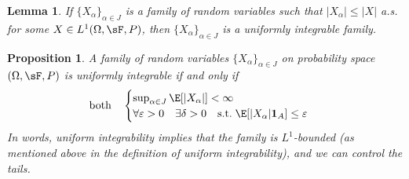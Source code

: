 \documentclass[12pt]{article}
\theoremstyle{plain}
\newtheorem{lem}[thm]{Lemma}
\newtheorem{prop}[thm]{Proposition}
\theoremstyle{definition}
\theoremstyle{remark}
\newcommand{\ra}{\rightarrow}
\newcommand{\one}[1]{\mathbf{1}_{#1}}
\begin{document}
\begin{lem}
If $\{X_\alpha\}_{\alpha\in J}$ is a family of random variables such
that $|X_\alpha|\leq |X|$ a.s. for some $X\in L^1(\Omega,\sF,P)$, then
$\{X_\alpha\}_{\alpha\in J}$ is a uniformly integrable family.
\end{lem}

\begin{prop}
A family of random variables $\{X_\alpha\}_{\alpha\in J}$
on probability space $(\Omega,\sF,P)$ is uniformly integrable if and
only if
\begin{align*}
  \text{both}\quad
  \begin{cases}
    \sup_{\alpha \in J} \E[|X_\alpha|]<\infty \\
    \forall\varepsilon>0
    \quad\exists \delta >0
    \quad\text{s.t.}\;
    \E[|X_\alpha|\one{A}]\leq\varepsilon
  \end{cases}
\end{align*}
In words, uniform integrability implies that the family is $L^1$-bounded
(as mentioned above in the definition of uniform integrability),
\emph{and} we can control the tails.
\end{prop}
\end{document}

